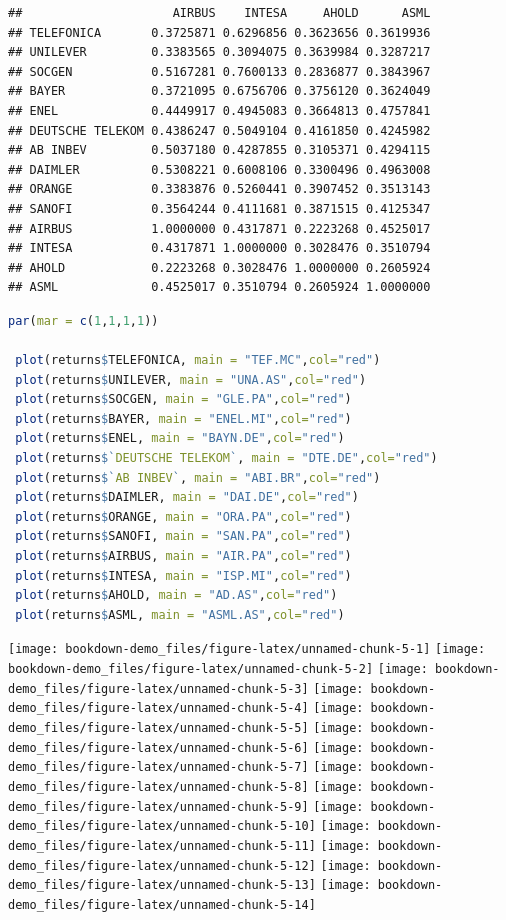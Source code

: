 \documentclass[
  12pt,
  brazil,
  a4paper,
  openany]{book}
\begin{document}
\begin{lstlisting}
##                     AIRBUS    INTESA     AHOLD      ASML
## TELEFONICA       0.3725871 0.6296856 0.3623656 0.3619936
## UNILEVER         0.3383565 0.3094075 0.3639984 0.3287217
## SOCGEN           0.5167281 0.7600133 0.2836877 0.3843967
## BAYER            0.3721095 0.6756706 0.3756120 0.3624049
## ENEL             0.4449917 0.4945083 0.3664813 0.4757841
## DEUTSCHE TELEKOM 0.4386247 0.5049104 0.4161850 0.4245982
## AB INBEV         0.5037180 0.4287855 0.3105371 0.4294115
## DAIMLER          0.5308221 0.6008106 0.3300496 0.4963008
## ORANGE           0.3383876 0.5260441 0.3907452 0.3513143
## SANOFI           0.3564244 0.4111681 0.3871515 0.4125347
## AIRBUS           1.0000000 0.4317871 0.2223268 0.4525017
## INTESA           0.4317871 1.0000000 0.3028476 0.3510794
## AHOLD            0.2223268 0.3028476 1.0000000 0.2605924
## ASML             0.4525017 0.3510794 0.2605924 1.0000000
\end{lstlisting}

\begin{lstlisting}[language=R]
par(mar = c(1,1,1,1))

 plot(returns$TELEFONICA, main = "TEF.MC",col="red")
 plot(returns$UNILEVER, main = "UNA.AS",col="red")
 plot(returns$SOCGEN, main = "GLE.PA",col="red")
 plot(returns$BAYER, main = "ENEL.MI",col="red")
 plot(returns$ENEL, main = "BAYN.DE",col="red")
 plot(returns$`DEUTSCHE TELEKOM`, main = "DTE.DE",col="red")
 plot(returns$`AB INBEV`, main = "ABI.BR",col="red")
 plot(returns$DAIMLER, main = "DAI.DE",col="red")
 plot(returns$ORANGE, main = "ORA.PA",col="red")
 plot(returns$SANOFI, main = "SAN.PA",col="red")
 plot(returns$AIRBUS, main = "AIR.PA",col="red")
 plot(returns$INTESA, main = "ISP.MI",col="red")
 plot(returns$AHOLD, main = "AD.AS",col="red")
 plot(returns$ASML, main = "ASML.AS",col="red")
\end{lstlisting}

\texttt{[image: bookdown-demo\_files/figure-latex/unnamed-chunk-5-1]} \texttt{[image: bookdown-demo\_files/figure-latex/unnamed-chunk-5-2]} \texttt{[image: bookdown-demo\_files/figure-latex/unnamed-chunk-5-3]} \texttt{[image: bookdown-demo\_files/figure-latex/unnamed-chunk-5-4]} \texttt{[image: bookdown-demo\_files/figure-latex/unnamed-chunk-5-5]} \texttt{[image: bookdown-demo\_files/figure-latex/unnamed-chunk-5-6]} \texttt{[image: bookdown-demo\_files/figure-latex/unnamed-chunk-5-7]} \texttt{[image: bookdown-demo\_files/figure-latex/unnamed-chunk-5-8]} \texttt{[image: bookdown-demo\_files/figure-latex/unnamed-chunk-5-9]} \texttt{[image: bookdown-demo\_files/figure-latex/unnamed-chunk-5-10]} \texttt{[image: bookdown-demo\_files/figure-latex/unnamed-chunk-5-11]} \texttt{[image: bookdown-demo\_files/figure-latex/unnamed-chunk-5-12]} \texttt{[image: bookdown-demo\_files/figure-latex/unnamed-chunk-5-13]} \texttt{[image: bookdown-demo\_files/figure-latex/unnamed-chunk-5-14]}
\end{document}
